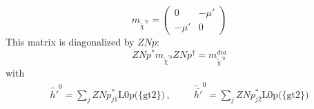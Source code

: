 \begin{itemize}
\begin{equation} 
m_{\tilde{\chi}^{'0}} = \left( 
\begin{array}{cc}
0 &- \mu' \\ 
- \mu'  &0\end{array} 
\right) 
 \end{equation} 
This matrix is diagonalized by \(ZNp\): 
\begin{equation} 
ZNp^* m_{\tilde{\chi}^{'0}} ZNp^{\dagger} = m^{dia}_{\tilde{\chi}^{'0}} 
\end{equation} 
with 
\begin{align} 
\tilde{h'}^{0} = \sum_{j}ZNp^*_{j 1}\text{L0p}\Big(\{\text{gt2}\}\Big)\,, \hspace{1cm} 
\tilde{\bar{h'}}^{0} = \sum_{j}ZNp^*_{j 2}\text{L0p}\Big(\{\text{gt2}\}\Big)
\end{align} 
\end{itemize} 
